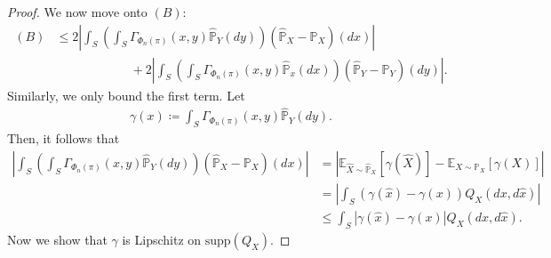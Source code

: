 \documentclass{article}
\begin{document}
\begin{proof}
	We now move onto $(B)$:
	\begin{align*}
		(B) &\leq 2 \left\vert \int_S\left(\int_S \Gamma_{\Phi_n(\pi)}(x,y) \hat{\mathbb{P}}_Y(dy) \right) (\hat{\mathbb{P}}_X - \mathbb{P}_X)(dx) \right\vert \\
			&\quad\quad\quad\quad\quad\quad + 2 \left\vert \int_S\left(\int_S \Gamma_{\Phi_n(\pi)}(x,y) \hat{\mathbb{P}}_x(dx) \right) (\hat{\mathbb{P}}_Y - \mathbb{P}_Y)(dy) \right\vert .
	\end{align*}
	Similarly, we only bound the first term. Let
	\begin{align*}
		\gamma(x) \coloneqq \int_S \Gamma_{\Phi_n(\pi)}(x,y) \hat{\mathbb{P}}_Y(dy) .
	\end{align*}
	Then, it follows that
	\begin{align*}
		\left\vert \int_S\left(\int_S \Gamma_{\Phi_n(\pi)}(x,y) \hat{\mathbb{P}}_Y(dy) \right) (\hat{\mathbb{P}}_X - \mathbb{P}_X)(dx) \right\vert &= \left\vert \mathbb{E}_{\hat{X} \sim \hat{\mathbb{P}}_X} [\gamma(\hat{X})] - \mathbb{E}_{X \sim \mathbb{P}_X} \left[\gamma(X)\right] \right\vert \\
		&= \left\vert \int_S (\gamma(\hat{x}) - \gamma(x)) Q_X(dx,d\hat{x}) \right\vert \\
		&\leq \int_S \left\vert \gamma(\hat{x}) - \gamma(x) \right\vert Q_X(dx,d\hat{x}) .
	\end{align*}
	Now we show that $\gamma$ is Lipschitz on $\mathrm{supp}(Q_X)$.
\end{proof}

\end{document}

